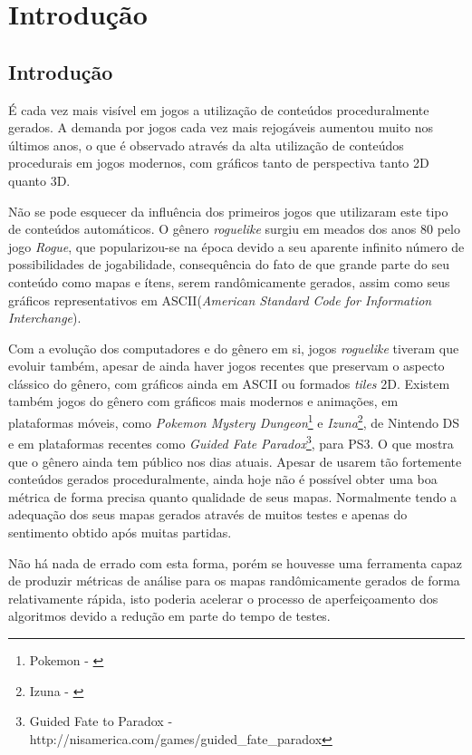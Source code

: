 \chapter*[Introdução]{Introdução}


\section*{Introdução}

É cada vez mais visível em jogos a utilização de conteúdos proceduralmente gerados. A demanda por jogos cada vez mais rejogáveis aumentou muito nos últimos anos, o que é observado através da alta utilização de conteúdos procedurais em jogos modernos, com gráficos tanto de perspectiva tanto 2D quanto 3D. 

Não se pode esquecer da influência dos primeiros jogos que utilizaram este tipo de conteúdos automáticos. O gênero \textit{roguelike} surgiu em meados dos anos 80 pelo jogo \textit{Rogue}, que popularizou-se na época devido a seu aparente infinito número de possibilidades de jogabilidade, consequência do fato de que grande parte do seu conteúdo como mapas e ítens, serem randômicamente gerados, assim como seus gráficos representativos em ASCII(\textit{American Standard Code for Information Interchange}).

Com a evolução dos computadores e do gênero em si, jogos  \textit{roguelike} tiveram que evoluir também, apesar de ainda haver jogos recentes que preservam o aspecto clássico do gênero, com gráficos ainda em ASCII ou formados \textit{tiles} 2D. Existem também jogos do gênero com gráficos mais modernos e animações, em plataformas móveis, como \textit{Pokemon Mystery Dungeon}\footnote{Pokemon - \cite{chunsoft}} e \textit{Izuna}\footnote{Izuna - \cite{izuna}}, de Nintendo DS e em plataformas recentes como \textit{Guided Fate Paradox}\footnote{Guided Fate to Paradox - http://nisamerica.com/games/guided\_fate\_paradox}, para PS3. O que mostra que o gênero ainda tem público nos dias atuais.
Apesar de usarem tão fortemente conteúdos gerados proceduralmente, ainda hoje não é possível obter uma boa métrica de forma precisa quanto qualidade de seus mapas. Normalmente tendo a adequação dos seus mapas gerados através de muitos testes e apenas do sentimento obtido após muitas partidas.
 
 Não há nada de errado com esta forma, porém se houvesse uma ferramenta capaz de produzir métricas de análise para os mapas randômicamente gerados de forma relativamente rápida, isto poderia acelerar o processo de aperfeiçoamento dos algoritmos devido a redução em parte do tempo de testes. 
 

